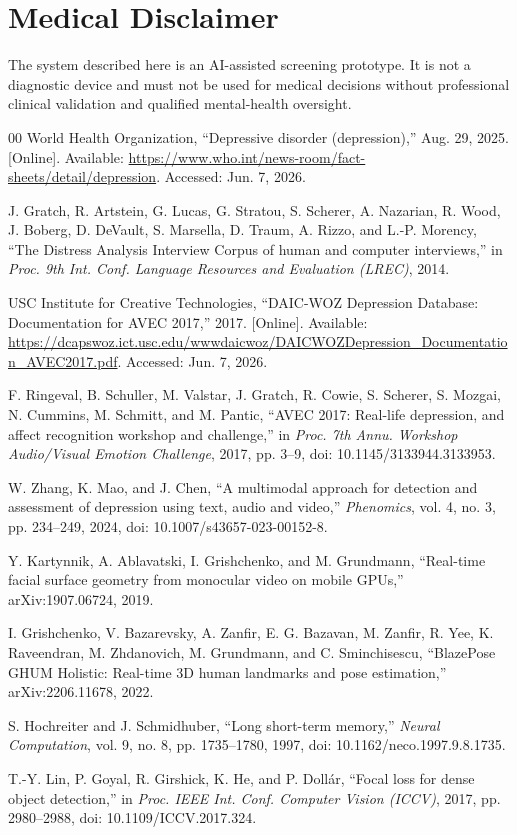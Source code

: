 \documentclass[conference]{IEEEtran}
\begin{document}
\section*{Medical Disclaimer}
The system described here is an AI-assisted screening prototype. It is not a diagnostic device and must not be used for medical decisions without professional clinical validation and qualified mental-health oversight.

\balance

\begin{thebibliography}{00}
World Health Organization, ``Depressive disorder (depression),'' Aug. 29, 2025. [Online]. Available: \url{https://www.who.int/news-room/fact-sheets/detail/depression}. Accessed: Jun. 7, 2026.

J. Gratch, R. Artstein, G. Lucas, G. Stratou, S. Scherer, A. Nazarian, R. Wood, J. Boberg, D. DeVault, S. Marsella, D. Traum, A. Rizzo, and L.-P. Morency, ``The Distress Analysis Interview Corpus of human and computer interviews,'' in \emph{Proc. 9th Int. Conf. Language Resources and Evaluation (LREC)}, 2014.

USC Institute for Creative Technologies, ``DAIC-WOZ Depression Database: Documentation for AVEC 2017,'' 2017. [Online]. Available: \url{https://dcapswoz.ict.usc.edu/wwwdaicwoz/DAICWOZDepression_Documentation_AVEC2017.pdf}. Accessed: Jun. 7, 2026.

F. Ringeval, B. Schuller, M. Valstar, J. Gratch, R. Cowie, S. Scherer, S. Mozgai, N. Cummins, M. Schmitt, and M. Pantic, ``AVEC 2017: Real-life depression, and affect recognition workshop and challenge,'' in \emph{Proc. 7th Annu. Workshop Audio/Visual Emotion Challenge}, 2017, pp. 3--9, doi: 10.1145/3133944.3133953.

W. Zhang, K. Mao, and J. Chen, ``A multimodal approach for detection and assessment of depression using text, audio and video,'' \emph{Phenomics}, vol. 4, no. 3, pp. 234--249, 2024, doi: 10.1007/s43657-023-00152-8.

Y. Kartynnik, A. Ablavatski, I. Grishchenko, and M. Grundmann, ``Real-time facial surface geometry from monocular video on mobile GPUs,'' arXiv:1907.06724, 2019.

I. Grishchenko, V. Bazarevsky, A. Zanfir, E. G. Bazavan, M. Zanfir, R. Yee, K. Raveendran, M. Zhdanovich, M. Grundmann, and C. Sminchisescu, ``BlazePose GHUM Holistic: Real-time 3D human landmarks and pose estimation,'' arXiv:2206.11678, 2022.

S. Hochreiter and J. Schmidhuber, ``Long short-term memory,'' \emph{Neural Computation}, vol. 9, no. 8, pp. 1735--1780, 1997, doi: 10.1162/neco.1997.9.8.1735.

T.-Y. Lin, P. Goyal, R. Girshick, K. He, and P. Doll\'ar, ``Focal loss for dense object detection,'' in \emph{Proc. IEEE Int. Conf. Computer Vision (ICCV)}, 2017, pp. 2980--2988, doi: 10.1109/ICCV.2017.324.
\end{thebibliography}
\end{document}
